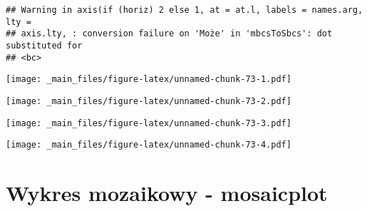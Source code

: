\documentclass[
]{book}
\newenvironment{Shaded}{\begin{snugshade}}{\end{snugshade}}
\newcommand{\AttributeTok}[1]{\textcolor[rgb]{0.77,0.63,0.00}{#1}}
\newcommand{\ConstantTok}[1]{\textcolor[rgb]{0.00,0.00,0.00}{#1}}
\newcommand{\FunctionTok}[1]{\textcolor[rgb]{0.00,0.00,0.00}{#1}}
\newcommand{\NormalTok}[1]{#1}
\newcommand{\SpecialCharTok}[1]{\textcolor[rgb]{0.00,0.00,0.00}{#1}}
\newcommand{\StringTok}[1]{\textcolor[rgb]{0.31,0.60,0.02}{#1}}
\begin{document}
\begin{verbatim}
## Warning in axis(if (horiz) 2 else 1, at = at.l, labels = names.arg, lty =
## axis.lty, : conversion failure on 'Może' in 'mbcsToSbcs': dot substituted for
## <bc>
\end{verbatim}

\texttt{[image: \_main\_files/figure-latex/unnamed-chunk-73-1.pdf]}

\begin{Shaded}
\end{Shaded}

\texttt{[image: \_main\_files/figure-latex/unnamed-chunk-73-2.pdf]}

\begin{Shaded}
\end{Shaded}

\texttt{[image: \_main\_files/figure-latex/unnamed-chunk-73-3.pdf]}

\begin{Shaded}
\end{Shaded}

\texttt{[image: \_main\_files/figure-latex/unnamed-chunk-73-4.pdf]}

\hypertarget{wykres-mozaikowy---mosaicplot}{%
\section{Wykres mozaikowy - mosaicplot}\label{wykres-mozaikowy---mosaicplot}}
\end{document}
